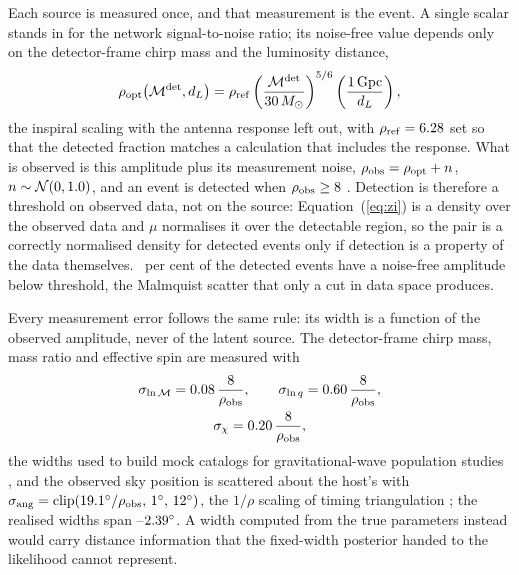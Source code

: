 Each source is measured once, and that measurement is the event. A single
scalar stands in for the network signal-to-noise ratio; its noise-free value depends
only on the detector-frame chirp mass and the luminosity distance,
\begin{equation}
  \rho_{\rm opt}\!\left(\mathcal{M}^{\rm det}, d_L\right) = \rho_{\rm ref}
     \left( \frac{\mathcal{M}^{\rm det}}{30\,M_\odot} \right)^{5/6}
     \left( \frac{1\,{\rm Gpc}}{d_L} \right),
  \label{eq:snr}
\end{equation}
the inspiral scaling with the antenna response left out, with
$\rho_{\rm ref} = 6.28$ set so that the detected fraction matches a
calculation that includes the response. What is observed is this amplitude
plus its measurement noise,
$\rho_{\rm obs} = \rho_{\rm opt} + n$, $n \sim \mathcal{N}(0, 1.0)$,
and an event is detected when $\rho_{\rm obs} \geq 8$
\citep{FishbachHolzFarr2018, Farah2023}. Detection is therefore a threshold on
observed data, not on the source: Equation~(\ref{eq:zi}) is a density over the
observed data and $\mu$ normalises it over the detectable region, so the pair
is a correctly normalised density for detected events only if detection is a
property of the data themselves. \EvMalmquist\ per cent of the detected events
have a noise-free amplitude below threshold, the Malmquist scatter that only a
cut in data space produces.

Every measurement error follows the same rule: its width is a function of the
observed amplitude, never of the latent source. The detector-frame chirp mass,
mass ratio and effective spin are measured with
\begin{equation}
\begin{gathered}
  \sigma_{\ln \mathcal{M}} = 0.08\,\frac{8}{\rho_{\rm obs}},
  \qquad
  \sigma_{\ln q} = 0.60\,\frac{8}{\rho_{\rm obs}},\\
  \sigma_{\chi} = 0.20\,\frac{8}{\rho_{\rm obs}},
\end{gathered}
  \label{eq:widths}
\end{equation}
the widths used to build mock catalogs for gravitational-wave population
studies \citep{FishbachHolzFarr2018, Farah2023}, and the observed sky position
is scattered about the host's with
$\sigma_{\rm ang} = \mathrm{clip}\!\left(
19.1^\circ/\rho_{\rm obs},\, 1^\circ,\, 12^\circ
\right)$, the $1/\rho$ scaling of timing triangulation \citep{Fairhurst2009};
the realised widths span \EvSkyMinReal--$2.39^\circ$. A width
computed from the true parameters instead would carry distance information
that the fixed-width posterior handed to the likelihood cannot represent.

